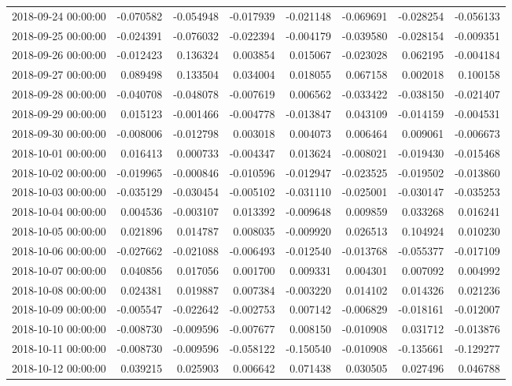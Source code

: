 \begin{tabular}{lrrrrrrr}
2018-09-24 00:00:00 & -0.070582 & -0.054948 & -0.017939 & -0.021148 & -0.069691 & -0.028254 & -0.056133 \\
2018-09-25 00:00:00 & -0.024391 & -0.076032 & -0.022394 & -0.004179 & -0.039580 & -0.028154 & -0.009351 \\
2018-09-26 00:00:00 & -0.012423 & 0.136324 & 0.003854 & 0.015067 & -0.023028 & 0.062195 & -0.004184 \\
2018-09-27 00:00:00 & 0.089498 & 0.133504 & 0.034004 & 0.018055 & 0.067158 & 0.002018 & 0.100158 \\
2018-09-28 00:00:00 & -0.040708 & -0.048078 & -0.007619 & 0.006562 & -0.033422 & -0.038150 & -0.021407 \\
2018-09-29 00:00:00 & 0.015123 & -0.001466 & -0.004778 & -0.013847 & 0.043109 & -0.014159 & -0.004531 \\
2018-09-30 00:00:00 & -0.008006 & -0.012798 & 0.003018 & 0.004073 & 0.006464 & 0.009061 & -0.006673 \\
2018-10-01 00:00:00 & 0.016413 & 0.000733 & -0.004347 & 0.013624 & -0.008021 & -0.019430 & -0.015468 \\
2018-10-02 00:00:00 & -0.019965 & -0.000846 & -0.010596 & -0.012947 & -0.023525 & -0.019502 & -0.013860 \\
2018-10-03 00:00:00 & -0.035129 & -0.030454 & -0.005102 & -0.031110 & -0.025001 & -0.030147 & -0.035253 \\
2018-10-04 00:00:00 & 0.004536 & -0.003107 & 0.013392 & -0.009648 & 0.009859 & 0.033268 & 0.016241 \\
2018-10-05 00:00:00 & 0.021896 & 0.014787 & 0.008035 & -0.009920 & 0.026513 & 0.104924 & 0.010230 \\
2018-10-06 00:00:00 & -0.027662 & -0.021088 & -0.006493 & -0.012540 & -0.013768 & -0.055377 & -0.017109 \\
2018-10-07 00:00:00 & 0.040856 & 0.017056 & 0.001700 & 0.009331 & 0.004301 & 0.007092 & 0.004992 \\
2018-10-08 00:00:00 & 0.024381 & 0.019887 & 0.007384 & -0.003220 & 0.014102 & 0.014326 & 0.021236 \\
2018-10-09 00:00:00 & -0.005547 & -0.022642 & -0.002753 & 0.007142 & -0.006829 & -0.018161 & -0.012007 \\
2018-10-10 00:00:00 & -0.008730 & -0.009596 & -0.007677 & 0.008150 & -0.010908 & 0.031712 & -0.013876 \\
2018-10-11 00:00:00 & -0.008730 & -0.009596 & -0.058122 & -0.150540 & -0.010908 & -0.135661 & -0.129277 \\
2018-10-12 00:00:00 & 0.039215 & 0.025903 & 0.006642 & 0.071438 & 0.030505 & 0.027496 & 0.046788 \\

\end{tabular}
